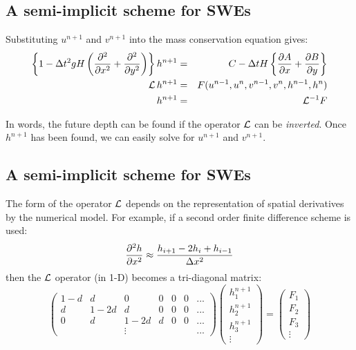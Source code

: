 \subsection{A semi-implicit scheme for SWEs}

Substituting $u^{n+1}$ and $v^{n+1}$ into the mass conservation
equation gives:
\begin{eqnarray*}
	\left\{ 1-\Delta t^2 gH \left( \frac{\partial ^2}{\partial x^2}+\frac{\partial ^2}{\partial y^2} \right) 
	\right\} h^{n+1}
	& = & C-\Delta t H \left\{ \frac{\partial A}{\partial x}+\frac{\partial B}{\partial y} \right\} \\
	{\cal L}\,h^{n+1} & = & F(u^{n-1},u^n,v^{n-1},v^n,h^{n-1},h^n) \\
	h^{n+1} & = & {\cal L}^{-1} F
\end{eqnarray*}

In words, the future depth can be found if the operator $\cal{L}$ can be
{\em inverted}. Once $h^{n+1}$ has been found, we can easily solve for
$u^{n+1}$ and $v^{n+1}$. 


\subsection{A semi-implicit scheme for SWEs}
The form of the operator $\cal{L}$ depends on the
representation of spatial derivatives by the numerical model. For
example, if a second order finite difference scheme is used:
\begin{equation}
	\frac{\partial ^2 h}{\partial x^2}\approx \frac{h_{i+1}-2h_i+h_{i-1}}{\Delta x^2}
\end{equation}
then the $\cal{L}$ operator (in 1-D) becomes a tri-diagonal matrix:
\begin{equation}
	\left(
	\begin{array}{ccccccc}
		1-d & d & 0 & 0 & 0 & 0 & ... \\
		d & 1-2d & d & 0 & 0 & 0 & ... \\
		0 & d & 1-2d & d & 0 & 0 & ... \\
		& & \vdots & & & & ... 
	\end{array}
	\right) \left(
	\begin{array}{c}
		h^{n+1}_1 \\
		h^{n+1}_2 \\
		h^{n+1}_3 \\
		\vdots
	\end{array}
	\right) = \left(
	\begin{array}{c}
		F_1 \\
		F_2 \\
		F_3 \\
		\vdots
	\end{array}
	\right)
\end{equation}


